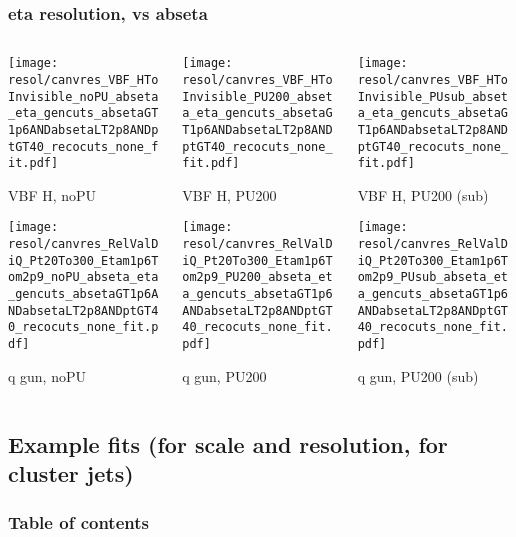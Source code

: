 \documentclass[8pt]{beamer}
\begin{document}
  \begin{frame}
  \frametitle{eta resolution, vs abseta}
  
  \begin{columns}
   \begin{column}{0.35\textwidth}
     \texttt{[image: resol/canvres\_VBF\_HToInvisible\_noPU\_abseta\_eta\_gencuts\_absetaGT1p6ANDabsetaLT2p8ANDptGT40\_recocuts\_none\_fit.pdf]}
     
     VBF H, noPU
    
     \texttt{[image: resol/canvres\_RelValDiQ\_Pt20To300\_Etam1p6Tom2p9\_noPU\_abseta\_eta\_gencuts\_absetaGT1p6ANDabsetaLT2p8ANDptGT40\_recocuts\_none\_fit.pdf]}
     
     q gun, noPU
   \end{column}
   \begin{column}{0.35\textwidth}
     \texttt{[image: resol/canvres\_VBF\_HToInvisible\_PU200\_abseta\_eta\_gencuts\_absetaGT1p6ANDabsetaLT2p8ANDptGT40\_recocuts\_none\_fit.pdf]}
     
     VBF H, PU200
    
     \texttt{[image: resol/canvres\_RelValDiQ\_Pt20To300\_Etam1p6Tom2p9\_PU200\_abseta\_eta\_gencuts\_absetaGT1p6ANDabsetaLT2p8ANDptGT40\_recocuts\_none\_fit.pdf]}
     
     q gun, PU200
   \end{column}
   \begin{column}{0.35\textwidth}
     \texttt{[image: resol/canvres\_VBF\_HToInvisible\_PUsub\_abseta\_eta\_gencuts\_absetaGT1p6ANDabsetaLT2p8ANDptGT40\_recocuts\_none\_fit.pdf]}
     
     VBF H, PU200 (sub)
    
     \texttt{[image: resol/canvres\_RelValDiQ\_Pt20To300\_Etam1p6Tom2p9\_PUsub\_abseta\_eta\_gencuts\_absetaGT1p6ANDabsetaLT2p8ANDptGT40\_recocuts\_none\_fit.pdf]}
     
     q gun, PU200 (sub)
   \end{column}
  \end{columns}
 \end{frame}
 
 
 
  \subsection{Example fits (for scale and resolution, for cluster jets)}

\begin{frame}
 \frametitle{Table of contents}
 
\end{frame}
\end{document}
